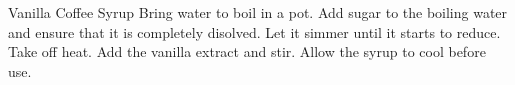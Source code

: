 \documentclass[../main.tex]{subfiles}
\begin{document}
\begin{recipe}{Vanilla Coffee Syrup}{}{}
    Bring water to boil in a pot.
    Add sugar to the boiling water and ensure that it is completely disolved.
    Let it simmer until it starts to reduce. Take off heat.
    Add the vanilla extract and stir. Allow the syrup to cool before use.
\end{recipe}
\end{document}
